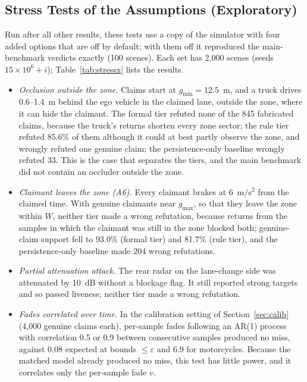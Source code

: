 \subsection{Stress Tests of the Assumptions (Exploratory)}\label{sec:stress}
Run after all other results, these tests use a copy of the simulator with four added options that are off by default; with them off it reproduced the main-benchmark verdicts exactly (100 scenes). Each set has 2,000 scenes (seeds \mbox{$15{\times}10^6{+}i$}); Table~\ref{tab:stressx} lists the results.
\begin{itemize}
\item \emph{Occlusion outside the zone.} Claims start at $g_{\min} = 12.5$~m, and a truck drives 0.6--1.4~m behind the ego vehicle in the claimed lane, outside the zone, where it can hide the claimant. The formal tier refuted none of the 845 fabricated claims, because the truck's returns shorten every zone sector; the rule tier refuted 85.6\% of them although it could at best partly observe the zone, and wrongly refuted one genuine claim; the persistence-only baseline wrongly refuted 33. This is the case that separates the tiers, and the main benchmark did not contain an occluder outside the zone.
\item \emph{Claimant leaves the zone (A6).} Every claimant brakes at 6~m/s$^2$ from the claimed time. With genuine claimants near $g_{\max}$, so that they leave the zone within $W$, neither tier made a wrong refutation, because returns from the samples in which the claimant was still in the zone blocked both; genuine-claim support fell to 93.0\% (formal tier) and 81.7\% (rule tier), and the persistence-only baseline made 204 wrong refutations.
\item \emph{Partial attenuation attack.} The rear radar on the lane-change side was attenuated by 10~dB without a blockage flag. It still reported strong targets and so passed liveness; neither tier made a wrong refutation.
\item \emph{Fades correlated over time.} In the calibration setting of Section~\ref{sec:calib} (4,000 genuine claims each), per-sample fades following an AR(1) process with correlation 0.5 or 0.9 between consecutive samples produced no miss, against 0.08 expected at bounds $\le \varepsilon$ and 6.9 for motorcycles. Because the matched model already produced no miss, this test has little power, and it correlates only the per-sample fade $v$.
\end{itemize}

